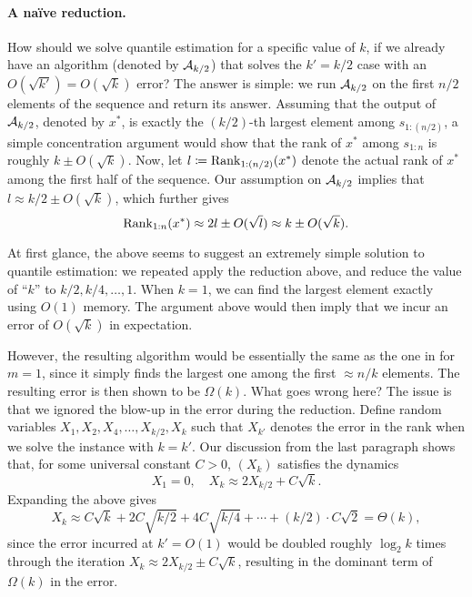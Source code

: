 \paragraph{A na\"ive reduction.} How should we solve quantile estimation for a specific value of $k$, if we already have an algorithm (denoted by $\mathcal{A}_{k/2}$) that solves the $k' = k/2$ case with an $O(\sqrt{k'}) = O(\sqrt{k})$ error? The answer is simple: we run $\mathcal{A}_{k/2}$ on the first $n/2$ elements of the sequence and return its answer. Assuming that the output of $\mathcal{A}_{k/2}$, denoted by $x^*$, is exactly the $(k/2)$-th largest element among $s_{1:(n/2)}$, a simple concentration argument would show that the rank of $x^*$ among $s_{1:n}$ is roughly $k \pm O(\sqrt{k})$. Now, let $l \coloneqq \mathrm{Rank}_{1:(n/2)}(x^*)$ denote the actual rank of $x^*$ among the first half of the sequence. Our assumption on $\mathcal{A}_{k/2}$ implies that $l \approx k/2 \pm O(\sqrt{k})$, which further gives
\[
    \mathrm{Rank}_{1:n}(x^*)
\approx 2l \pm O(\sqrt{l})
\approx k \pm O(\sqrt{k}).
\]

At first glance, the above seems to suggest an extremely simple solution to quantile estimation: we repeated apply the reduction above, and reduce the value of ``$k$'' to $k/2, k/4, \ldots, 1$. When $k = 1$, we can find the largest element exactly using $O(1)$ memory. The argument above would then imply that we incur an error of $O(\sqrt{k})$ in expectation.

However, the resulting algorithm would be essentially the same as the one in  for $m = 1$, since it simply finds the largest one among the first $\approx n/k$ elements. The resulting error is then shown to be $\Omega(k)$. What goes wrong here? The issue is that we ignored the blow-up in the error during the reduction. Define random variables $X_1, X_2, X_4, \ldots, X_{k/2}, X_k$ such that $X_{k'}$ denotes the error in the rank when we solve the instance with $k = k'$. Our discussion from the last paragraph shows that, for some universal constant $C > 0$, $(X_k)$ satisfies the dynamics
\begin{equation}\label{eq:dynamics-naive}
    X_1 = 0,
\quad
    X_k \approx 2X_{k/2} + C\sqrt{k}.
\end{equation}
Expanding the above gives
\[
    X_k
\approx C\sqrt{k} + 2C\sqrt{k/2} + 4C\sqrt{k/4} + \cdots + (k/2)\cdot C\sqrt{2}
=   \Theta(k),
\]
since the error incurred at $k' = O(1)$ would be doubled roughly $\log_2 k$ times through the iteration $X_k \approx 2X_{k/2} \pm C\sqrt{k}$, resulting in the dominant term of $\Omega(k)$ in the error.

